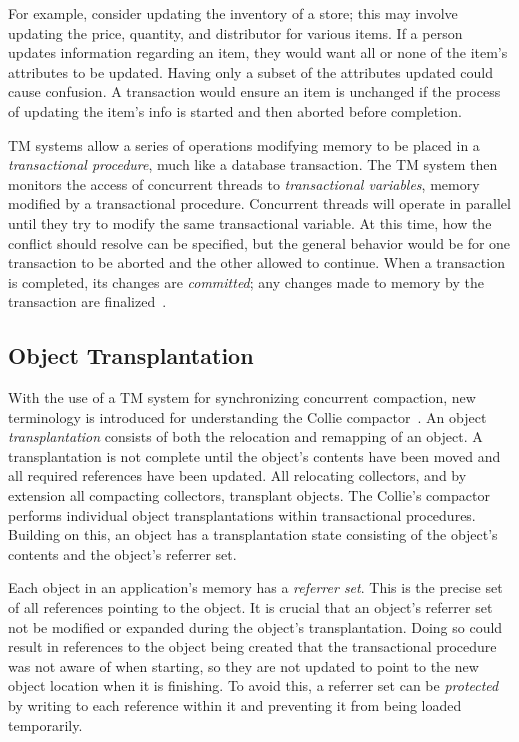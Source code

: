 \documentclass{sig-alternate}
\begin{document}
For example, consider updating the inventory of a store; this may involve updating
the price, quantity, and distributor for various items. 
If a person updates information regarding an item, they would 
want all or none of the item's attributes to be updated. Having
only a subset of the attributes updated could cause confusion. A transaction
would ensure an item is unchanged if the process of updating the item's info 
is started and then aborted before completion.

TM systems allow a series
of operations modifying memory to be placed in
a \emph{transactional procedure}, much like a database transaction.
The TM system then monitors the access of concurrent threads to \emph{transactional variables},
memory modified by a transactional procedure.
Concurrent threads will operate in parallel until they try to modify
the same transactional variable. At this time, how 
the conflict should resolve can be specified, but the general behavior would be for one transaction
to be aborted and the other allowed to continue.
When a transaction is completed, its changes are \emph{committed}; any changes 
made to memory by the transaction are finalized~\cite{wiki:transactional-memory}.


\subsection{Object Transplantation}
\label{sec:collieTransplantation}

With the use of a TM system for synchronizing concurrent compaction,
new terminology is introduced for understanding the Collie 
compactor~\cite{Iyengar:Collie}. 
An object \emph{transplantation} consists of both the relocation and 
remapping of an object. A transplantation is not complete until
the object's contents have been moved and all required references have been
updated. All relocating collectors, and by extension all
compacting collectors, transplant objects. The Collie's compactor 
performs individual object transplantations within transactional procedures. 
Building on this, an object has a transplantation state consisting of the object's contents 
and the object's referrer set.

Each object in an application's memory has a \emph{referrer set}. This is the precise set 
of all references pointing to the object. It is crucial that an object's referrer set not
be modified or expanded during the object's transplantation. Doing so could result
in references to the object being created that the transactional procedure
was not aware of when starting, so they are not updated to point to 
the new object location when it is finishing. To avoid this, a referrer set can be
\emph{protected} by writing to each reference within it and preventing it from
being loaded temporarily.
\end{document}
